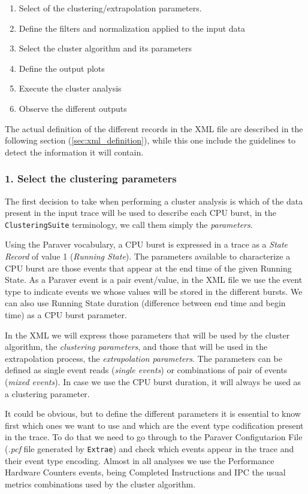 \documentclass[a4paper, 12pt]{article}
\begin{document}
\begin{enumerate}
  \item Select of the clustering/extrapolation parameters.
  \item Define the filters and normalization applied to the input data
  \item Select the cluster algorithm and its parameters
  \item Define the output plots
  \item Execute the cluster analysis
  \item Observe the different outputs
\end{enumerate}

The actual definition of the different records in the XML file are described
in the following section (\ref{sec:xml_definition}), while this one include
the guidelines to detect the information it will contain.

\subsubsection*{1. Select the clustering parameters}

The first decision to take when performing a cluster analysis is which
of the data present in the input trace will be used to describe each
CPU burst, in the \texttt{ClusteringSuite} terminology, we call them simply
the \textit{parameters}.

Using the Paraver vocabulary, a CPU burst is expressed in a trace
as a \textit{State Record} of value 1 (\textit{Running State}). The
parameters available to characterize a CPU burst are those events that appear
at the end time of the given Running State. As a Paraver event is a pair 
event/value, in the XML file we use the event type to indicate events we 
whose values will be stored in the different bursts. We can also use
Running State duration (difference between end time and begin time) as 
a CPU burst parameter.

In the XML we will express those parameters that will be used by the cluster
algorithm, the \textit{clustering parameters}, and those that will be used
in the extrapolation process, the \textit{extrapolation parameters}. The
parameters can be defined as single event reads (\textit{single events}) 
or combinations of pair of events (\textit{mixed events}). In case we use
the CPU burst duration, it will always be used as a clustering parameter.

It could be obvious, but to define the different parameters it is essential
to know first which ones we want to use and which are the event type
codification present in the trace. To do that we need to go through to the 
Paraver Configutarion File (\textit{.pcf} file generated by \texttt{Extrae}) 
and check which events appear in the trace and their event type encoding.
Almost in all analyses we use the Performance Hardware Counters events,
being Completed Instructions and IPC the usual metrics combinations used by
the cluster algorithm.
\end{document}
